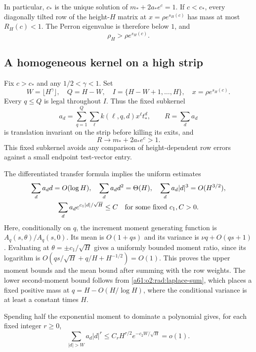 \documentclass[11pt,letterpaper]{article}
\numberwithin{equation}{section}
\theoremstyle{remark}\newtheorem{remark}[theorem]{Remark}
\begin{document}
In particular, $c_*$ is the unique solution of
$m_*+2a_* e^c=1$. If $c<c_*$, every
diagonally tilted row of the height-$H$ matrix at $x=\rho e^{s_H(c)}$
has mass at most $R_H(c)<1$. The Perron eigenvalue is therefore below
$1$, and
\begin{equation}\label{a61:o2:rad:lower-radius}
 \rho_H>\rho e^{s_H(c)}.
\end{equation}

\subsection{A homogeneous kernel on a high strip}

Fix $c>c_*$ and any $1/2<\gamma<1$. Set
\[
 W=\lfloor H^\gamma\rfloor,\quad Q=H-W,\quad
 I=\{H-W+1,\ldots,H\},\quad x=\rho e^{s_H(c)}.
\]
Every $q\le Q$ is legal throughout $I$. Thus the fixed subkernel
\[
 a_d=\sum_{q=1}^Q\sum_\ell k(\ell,q,d)x^\ell t_*^d,
 \qquad R=\sum_d a_d
\]
is translation invariant on the strip before killing its exits, and
\begin{equation}\label{a61:o2:rad:supercritical-mass}
 R\longrightarrow m_*+2a_* e^c>1.
\end{equation}
This fixed subkernel avoids any comparison of height-dependent row
errors against a small endpoint test-vector entry.

The differentiated transfer formula implies the uniform estimates
\begin{gather}
 \sum_d a_dd=O(\log H),\quad
 \sum_d a_dd^2=\Theta(H),\quad
 \sum_d a_d|d|^3=O(H^{3/2}),\label{a61:o2:rad:moments}\\
 \sum_d a_d e^{c_1|d|/\sqrt H}\le C
 \quad\hbox{for some fixed }c_1,C>0.\label{a61:o2:rad:exponential-moment}
\end{gather}
Here, conditionally on $q$, the increment moment generating function
is $A_q(s,\theta)/A_q(s,0)$. Its mean is $O(1+qs)$ and its variance is
$\nu q+O(qs+1)$. Evaluating at $\theta=\pm c_1/\sqrt H$ gives a
uniformly bounded moment ratio, since its logarithm is
$O(qs/\sqrt H+q/H+H^{-1/2})=O(1)$.
This proves the upper moment bounds and the mean bound after summing
with the row weights. The lower second-moment bound follows from
\eqref{a61:o2:rad:laplace-sum}, which places a fixed positive mass at
$q=H-O(H/\log H)$, where the conditional variance is at least a
constant times $H$.

Spending half the exponential moment to dominate a polynomial gives,
for each fixed integer $r\ge0$,
\begin{equation}\label{a61:o2:rad:tail}
 \sum_{|d|>W}a_d|d|^r
 \le C_rH^{r/2}e^{-c_2W/\sqrt H}=o(1).
\end{equation}
\end{document}
